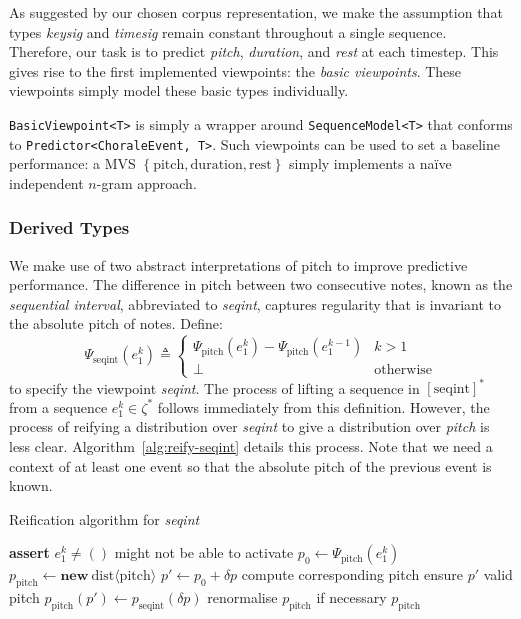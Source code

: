 \documentclass[12pt,a4paper,twoside,openright]{report}
\newcommand{\set}[1]{ \left\{ #1 \right\} }
\begin{document}
As suggested by our chosen corpus representation, we make the assumption that
types \emph{keysig} and \emph{timesig} remain constant throughout a single
sequence. Therefore, our task is to predict \emph{pitch}, \emph{duration}, and
\emph{rest} at each timestep. This gives rise to the first implemented
viewpoints: the \emph{basic viewpoints}. These viewpoints simply model these
basic types individually.

\texttt{BasicViewpoint<T>} is simply a wrapper around \texttt{SequenceModel<T>}
that conforms to \texttt{Predictor<ChoraleEvent, T>}. Such viewpoints can be
used to set a baseline performance: a MVS $\set{\mathrm{pitch},
\mathrm{duration}, \mathrm{rest}}$ simply implements a naïve independent
$n$-gram approach.

\subsubsection{Derived Types}

We make use of two abstract interpretations of pitch to improve predictive
performance. The difference in pitch between two consecutive notes, known as the
\emph{sequential interval}, abbreviated to \emph{seqint}, captures regularity
that is invariant to the absolute pitch of notes. Define:
$$ \Psi_{\mathrm{seqint}}(e_1^k) \triangleq \begin{cases}
  \Psi_{\mathrm{pitch}}(e_1^k) - \Psi_{\mathrm{pitch}}(e_1^{k-1}) & k > 1 \\
  \bot & \text{otherwise} 
\end{cases}
$$
to specify the viewpoint \emph{seqint}. The process of lifting a sequence in
$[\mathrm{seqint}]^*$ from a sequence $e_1^k \in \zeta^*$ follows immediately
from this definition. However, the process of reifying a distribution over
\emph{seqint} to give a distribution over \emph{pitch} is less clear.
Algorithm~\ref{alg:reify-seqint} details this process. Note that we need a
context of at least one event so that the absolute pitch of the previous event
is known.

\begin{algorithm}[H]
  \caption{Reification algorithm for \emph{seqint}}
  \label{alg:reify-seqint}
  \begin{algorithmic}[1]
      \State \textbf{assert} $e_1^k \neq ()$
      \Comment might not be able to activate
      \State $p_0 \gets \Psi_{\mathrm{pitch}}(e_1^k)$
      \State $p_{\mathrm{pitch}} \gets \textbf{new}\
      \mathrm{dist}\langle\mathrm{pitch}\rangle$
        \State $p' \gets p_0 + \delta p$
        \Comment compute corresponding pitch
          \Comment ensure $p'$ valid pitch
          \State $p_{\mathrm{pitch}}(p') \gets p_{\mathrm{seqint}}(\delta p)$
        \EndIf
      \EndFor
      \State renormalise $p_{\mathrm{pitch}}$ if necessary
      \State \Return $p_{\mathrm{pitch}}$
    \EndFunction
  \end{algorithmic}
\end{algorithm}
\end{document}
